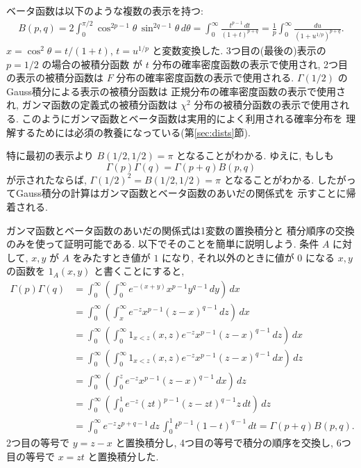 \documentclass[12pt,twoside]{jarticle}
\theoremstyle{jplain}
\theoremstyle{jplain}
\theoremstyle{jplain}
\numberwithin{theorem}{section}
\numberwithin{equation}{section}
\numberwithin{figure}{section}
\numberwithin{table}{section}
\newcommand\secref[1]{第\ref{#1}節}
\begin{document}
ベータ函数は以下のような複数の表示を持つ:
\begin{align*}
B(p,q)
=2\int_0^{\pi/2} \cos^{2p-1}\theta\,\sin^{2q-1}\theta\,d\theta
=\int_0^\infty \frac{t^{p-1}\,dt}{(1+t)^{p+q}}
=\frac{1}{p}\int_0^\infty \frac{du}{(1+u^{1/p})^{p+q}}.
\end{align*}
$x=\cos^2\theta=t/(1+t)$, $t=u^{1/p}$ と変数変換した.
3つ目の(最後の)表示の $p=1/2$ の場合の被積分函数
が $t$ 分布の確率密度函数の表示で使用され,
2つ目の表示の被積分函数は $F$ 分布の確率密度函数の表示で使用される.
$\Gamma(1/2)$ のGauss積分による表示の被積分函数は
正規分布の確率密度函数の表示で使用され, 
ガンマ函数の定義式の被積分函数は $\chi^2$ 分布の被積分函数の表示で使用される.
このようにガンマ函数とベータ函数は実用的によく利用される確率分布を
理解するためには必須の教養になっている(\secref{sec:dists}).

特に最初の表示より $B(1/2,1/2)=\pi$ となることがわかる.
ゆえに, もしも
\[
\Gamma(p)\Gamma(q)=\Gamma(p+q)B(p,q)
\]
が示されたならば, $\Gamma(1/2)^2=B(1/2,1/2)=\pi$ となることがわかる.
したがってGauss積分の計算はガンマ函数とベータ函数のあいだの関係式を
示すことに帰着される.

ガンマ函数とベータ函数のあいだの関係式は1変数の置換積分と
積分順序の交換のみを使って証明可能である.
以下でそのことを簡単に説明しよう.
条件 $A$ に対して, $x,y$ が $A$ をみたすとき値が $1$ になり, 
それ以外のときに値が $0$ になる $x,y$ の函数を $1_A(x,y)$ と書くことにすると,
\begin{align*}
\Gamma(p)\Gamma(q)
&=
\int_0^\infty
\left(
\int_0^\infty e^{-(x+y)} x^{p-1} y^{q-1}\,dy
\right)\,dx
\\ &
=
\int_0^\infty
\left(
\int_x^\infty e^{-z} x^{p-1} (z-x)^{q-1}\,dz
\right)\,dx
\\ &
=
\int_0^\infty
\left(
\int_0^\infty 1_{x<z}(x,z) e^{-z} x^{p-1} (z-x)^{q-1}\,dz
\right)\,dx
\\ &
=
\int_0^\infty
\left(
\int_0^\infty 1_{x<z}(x,z) e^{-z} x^{p-1} (z-x)^{q-1}\,dx
\right)\,dz
\\ &
=
\int_0^\infty
\left(
\int_0^z e^{-z} x^{p-1} (z-x)^{q-1}\,dx
\right)\,dz
\\ &
=
\int_0^\infty
\left(
\int_0^1 e^{-z} (zt)^{p-1} (z-zt)^{q-1}z\,dt
\right)\,dz
\\ &
=\int_0^\infty e^{-z}z^{p+q-1}\,dz
\,\int_0^1 t^{p-1}(1-t)^{q-1}\,dt
=\Gamma(p+q)B(p,q).
\end{align*}
2つ目の等号で $y=z-x$ と置換積分し, 
4つ目の等号で積分の順序を交換し, 
6つ目の等号で $x=zt$ と置換積分した.
\end{document}
